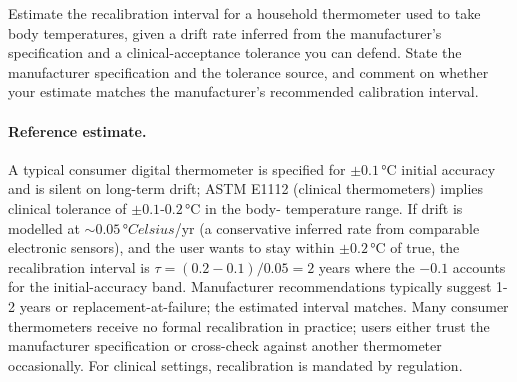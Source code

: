\begin{exercise}
Estimate the recalibration interval for a household thermometer
used to take body temperatures, given a drift rate inferred from
the manufacturer's specification and a clinical-acceptance
tolerance you can defend. State the manufacturer specification and
the tolerance source, and comment on whether your estimate matches
the manufacturer's recommended calibration interval.

\paragraph{Reference estimate.}
A typical consumer digital thermometer is specified for $\pm 0.1
\,\si{\degreeCelsius}$ initial accuracy and is silent on long-term
drift; ASTM E1112 (clinical thermometers) implies clinical
tolerance of $\pm 0.1$-$0.2 \,\si{\degreeCelsius}$ in the body-
temperature range. If drift is modelled at $\sim 0.05 \,\si{\degree
Celsius}$/yr (a conservative inferred rate from comparable
electronic sensors), and the user wants to stay within $\pm 0.2
\,\si{\degreeCelsius}$ of true, the recalibration interval is
$\tau = (0.2 - 0.1) / 0.05 = 2$ years where the $-0.1$ accounts
for the initial-accuracy band. Manufacturer recommendations
typically suggest 1-2 years or replacement-at-failure; the
estimated interval matches. Many consumer thermometers receive
no formal recalibration in practice; users either trust the
manufacturer specification or cross-check against another
thermometer occasionally. For clinical settings, recalibration is
mandated by regulation.
\end{exercise}

